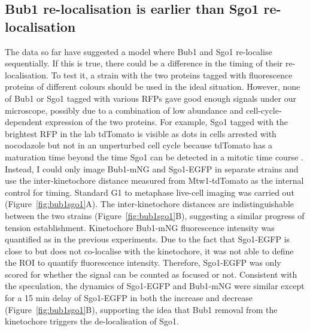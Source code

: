 \subsection{Bub1 re-localisation is earlier than Sgo1 re-localisation}
The data so far have suggested a model where Bub1 and Sgo1 re-localise sequentially. If this is true, there could be a difference in the timing of their re-localisation. To test it, a strain with the two proteins tagged with fluorescence proteins of different colours should be used in the ideal situation. However, none of Bub1 or Sgo1 tagged with various RFPs gave good enough signals under our microscope, possibly due to a combination of low abundance and cell-cycle-dependent expression of the two proteins. For example, Sgo1 tagged with the brightest RFP in the lab tdTomato is visible as dots in cells arrested with nocodazole but not in an unperturbed cell cycle because tdTomato has a maturation time beyond the time Sgo1 can be detected in a mitotic time course \citep{Indjeian2005a}. Instead, I could only image Bub1-mNG and Sgo1-EGFP in separate strains and use the inter-kinetochore distance measured from Mtw1-tdTomato as the internal control for timing. Standard G1 to metaphase live-cell imaging was carried out (Figure~\ref{fig:bub1sgo1}A). The inter-kinetochore distances are indistinguishable between the two strains (Figure~\ref{fig:bub1sgo1}B), suggesting a similar progress of tension establishment. Kinetochore Bub1-mNG fluorescence intensity was quantified as in the previous experiments. Due to the fact that Sgo1-EGFP is close to but does not co-localise with the kinetochore, it was not able to define the ROI to quantify fluorescence intensity. Therefore, Sgo1-EGFP was only scored for whether the signal can be counted as focused or not. Consistent with the speculation, the dynamics of Sgo1-EGFP and Bub1-mNG were similar except for a 15 \si{\minute} delay of Sgo1-EGFP in both the increase and decrease (Figure~\ref{fig:bub1sgo1}B), supporting the idea that Bub1 removal from the kinetochore triggers the de-localisation of Sgo1. 


